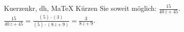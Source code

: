 \begin{MAufgabe}{Kuerzen}{kr, dh, MaTeX}
K\"urzen Sie soweit m\"oglich: $\frac{15}{40\, z + 45}$.\\ 
\ifLsg\MLoesung
\quad $\frac{15}{40\, z + 45}=\frac{(5)\cdot(3)}{(5)\cdot(8\, z + 9)}=\frac{3}{8\, z + 9}$.\else\relax\fi
 \end{MAufgabe}